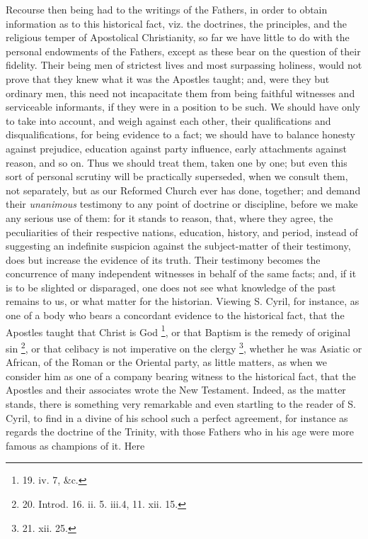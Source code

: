 Recourse then being had to the
writings of the Fathers, in order to obtain information as to this
historical fact, viz. the doctrines, the principles, and the religious
temper of Apostolical Christianity, so far we have little to do with
the personal endowments of the Fathers, except as these bear on the
question of their fidelity. Their being men of strictest lives and
most surpassing holiness, would not prove that they knew what it was
the Apostles taught; and, were they but ordinary men, this need
not incapacitate them from being faithful witnesses and serviceable
informants, if they were in a position to be such. We should have only
to take into account, and weigh against each other, their
qualifications and disqualifications, for being evidence to a fact; we
should have to balance honesty against prejudice, education against
party influence, early attachments against reason, and so on. Thus we
should treat them, taken one by one; but even this sort of personal
scrutiny will be practically superseded, when we consult them, not
separately, but as our Reformed Church ever has done, together; and
demand their \emph{unanimous} testimony to any point of doctrine or
discipline, before we make any serious use of them: for it stands to
reason, that, where they agree, the peculiarities of their respective
nations, education, history, and period, instead of suggesting an
indefinite suspicion against the subject-matter of their testimony,
does but increase the evidence of its truth. Their testimony becomes
the concurrence of many independent witnesses in behalf of the same
facts; and, if it is to be slighted or disparaged, one does not see
what knowledge of the past remains to us, or what matter for the
historian. Viewing S. Cyril, for instance, as one of a body who bears
a concordant evidence to the historical fact, that the Apostles taught
that Christ is God \footnote{19. iv.
7, \&c.}, or
that Baptism is the remedy of original sin \footnote{20.
Introd. 16. ii. 5. iii.4, 11. xii. 15.}, or that celibacy is not imperative on the clergy \footnote{21. xii.
25.}, whether he was Asiatic or African, of the Roman or the
Oriental party, as little matters, as when we consider him as one of a
company bearing witness to the historical fact, that the Apostles and
their associates wrote the New Testament. Indeed, as the matter
stands, there is something very remarkable and even startling to the
reader of S. Cyril, to find in a divine of his school such a perfect
agreement, for instance as regards the doctrine of the Trinity, with
those Fathers who in his age were more famous as champions of it. Here
